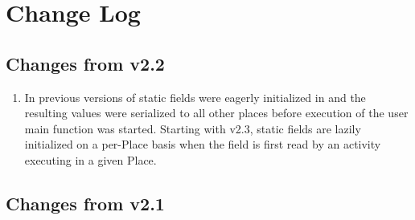 \chapter{Change Log}

\section{Changes from \Xten{} v2.2}

\begin{enumerate}

\item In previous versions of \Xten{} static fields were
  eagerly initialized in  and the resulting values were
  serialized to all other places before execution of the user main
  function was started. Starting with \Xten{} v2.3, static fields are
  lazily initialized on a per-Place basis when the field is first read
  by an activity executing in a given Place.

\end{enumerate}

\section{Changes from \Xten{} v2.1}

